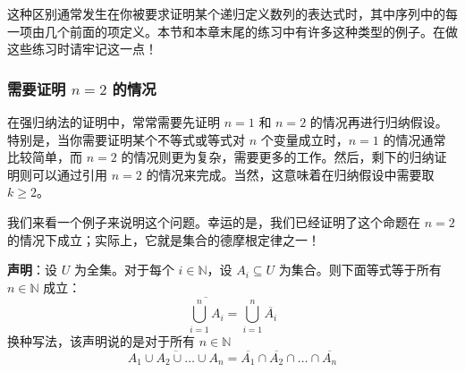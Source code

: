 这种区别通常发生在你被要求证明某个递归定义数列的表达式时，其中序列中的每一项由几个前面的项定义。本节和本章末尾的练习中有许多这种类型的例子。在做这些练习时请牢记这一点！

\subsubsection*{需要证明 $n=2$ 的情况}

在强归纳法的证明中，常常需要先证明 $n = 1$ 和 $n = 2$ 的情况再进行归纳假设。特别是，当你需要证明某个不等式或等式对 $n$ 个变量成立时，$n = 1$ 的情况通常比较简单，而 $n = 2$ 的情况则更为复杂，需要更多的工作。然后，剩下的归纳证明则可以通过引用 $n = 2$ 的情况来完成。当然，这意味着在归纳假设中需要取 $k \ge 2$。

我们来看一个例子来说明这个问题。幸运的是，我们已经证明了这个命题在 $n = 2$ 的情况下成立；实际上，它就是集合的德摩根定律之一！\\

\begin{example}[集合的广义德摩根定律：]

    \textbf{声明}：设 $U$ 为全集。对于每个 $i \in \mathbb{N}$，设 $A_i \subseteq U$ 为集合。则下面等式等于所有 $n \in \mathbb{N}$ 成立：
    \[\overline{\bigcup_{i=1}^{n} A_i} = \bigcup_{i=1}^{n} \overline{A_i}\]
    换种写法，该声明说的是对于所有 $n \in \mathbb{N}$
    \[\overline{A_1 \cup A_2 \cup \dots \cup A_n} = \overline{A_1} \cap \overline{A_2} \cap \dots \cap \overline{A_n}\]
\end{example}

